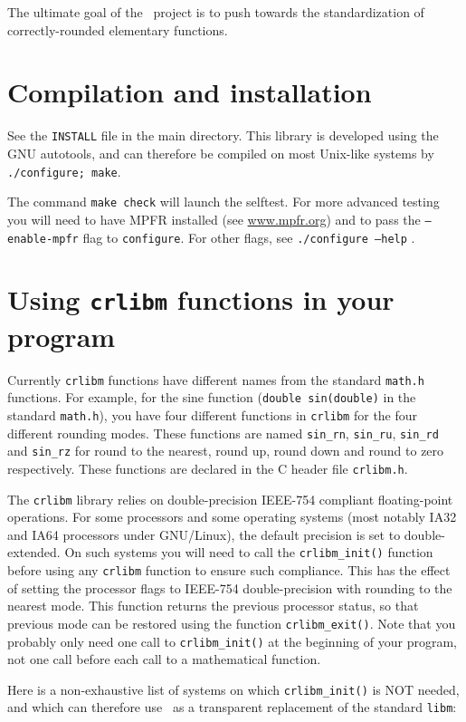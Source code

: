 The ultimate goal of the \crlibm\ project is to push towards the
standardization of correctly-rounded elementary functions.

\section{Compilation and installation}
See the \texttt{INSTALL} file in the main directory. This library is
developed using the GNU autotools, and can therefore be compiled on
most Unix-like systems by \texttt{./configure; make}.


The command \texttt{make check} will launch the selftest.
For more advanced testing you will need to have MPFR installed (see
\url{www.mpfr.org}) and to pass the \texttt{--enable-mpfr} flag to
\texttt{configure}. For other flags, see \texttt{./configure --help} .

\section{Using \texttt{crlibm} functions in your program}

Currently \texttt{crlibm} functions have different names from the
standard \texttt{math.h} functions. For example, for the sine function
(\texttt{double sin(double)} in the standard \texttt{math.h}), you
have four different functions in \texttt{crlibm} for the four
different rounding modes. These functions are named \texttt{sin\_rn},
\texttt{sin\_ru}, \texttt{sin\_rd} and \texttt{sin\_rz} for round to the
nearest, round up, round down and round to zero respectively. These
functions are declared in the C header file \texttt{crlibm.h}.

The \texttt{crlibm} library relies on double-precision IEEE-754
compliant floating-point operations.  For some processors and some
operating systems (most notably IA32 and IA64 processors under
GNU/Linux), the default precision is set to double-extended.  On such
systems you will need to call the \texttt{crlibm\_init()} function
before using any \texttt{crlibm} function to ensure such compliance.
This has the effect of setting the processor flags to IEEE-754
double-precision with rounding to the nearest mode.  This function
returns the previous processor status, so that previous mode can be
restored using the function \texttt{crlibm\_exit()}. Note that you
probably only need one call to \texttt{crlibm\_init()} at the beginning
of your program, not one call before each call to a mathematical
function.

Here is a non-exhaustive list of systems on which
\texttt{crlibm\_init()} is NOT needed, and which can therefore use
\crlibm\ as a transparent replacement of the standard \texttt{libm}:

